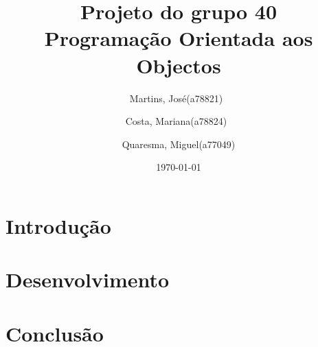 \documentclass[a4paper,12pt,portuguese]{report}
\title{Projeto do grupo 40 \\Programação Orientada aos Objectos}
\author{Martins, José(a78821)\
        \and
        Costa, Mariana(a78824)\
        \and
        Quaresma, Miguel(a77049)
        }
\date{\today}
\begin{document}
 
\begin{titlepage}
\maketitle
\end{titlepage}
 
\tableofcontents
 
\chapter{Introdução}


\chapter{Desenvolvimento}

\chapter{Conclusão}
\end{document}
